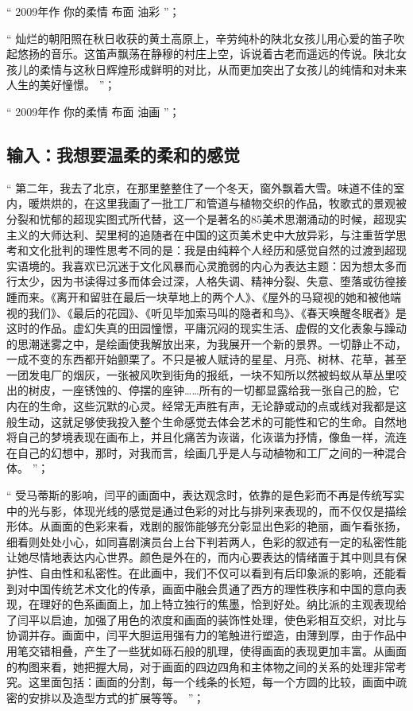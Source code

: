 \documentclass[master,oneside]{zjuthesis}
\begin{document}
“ 2009年作 你的柔情 布面 油彩 ”；

“ 灿烂的朝阳照在秋日收获的黄土高原上，辛劳纯朴的陕北女孩儿用心爱的笛子吹起悠扬的音乐。这笛声飘荡在静穆的村庄上空，诉说着古老而遥远的传说。陕北女孩儿的柔情与这秋日辉煌形成鲜明的对比，从而更加突出了女孩儿的纯情和对未来人生的美好憧憬。 ”；

“ 2009年作 你的柔情 布面 油画 ”；

\subsection{输入：我想要温柔的柔和的感觉}
“ 第二年，我去了北京，在那里整整住了一个冬天，窗外飘着大雪。味道不佳的室内，暖烘烘的，在这里我画了一批工厂和管道与植物交织的作品，牧歌式的景观被分裂和忧郁的超现实图式所代替，这一个是著名的85美术思潮涌动的时候，超现实主义的大师达利、契里柯的追随者在中国的这页美术史中大放异彩，与注重哲学思考和文化批判的理性思考不同的是：我是由纯粹个人经历和感觉自然的过渡到超现实语境的。我喜欢已沉迷于文化风暴而心灵脆弱的内心为表达主题：因为想太多而行太少，因为书读得过多而体会过深，人格失调、精神分裂、失意、堕落或彷徨接踵而来。《离开和留驻在最后一块草地上的两个人》、《屋外的马窥视的她和被他端视的我们》、《最后的花园》、《听见毕加索马叫的隐者和鸟》、《春天唤醒冬眠者》是这时的作品。虚幻失真的田园憧憬，平庸沉闷的现实生活、虚假的文化表象与躁动的思潮迷雾之中，是绘画使我解放出来，为我展开一个新的景界。一切静止不动，一成不变的东西都开始颤栗了。不只是被人赋诗的星星、月亮、树林、花草，甚至一团发电厂的烟灰，一张被风吹到街角的报纸，一块不知所以然被蚂蚁从草丛里咬出的树皮，一座锈蚀的、停摆的座钟……所有的一切都显露给我一张自己的脸，它内在的生命，这些沉默的心灵。经常无声胜有声，无论静或动的点或线对我都是这般生动，这就足够使我投入整个生命感觉去体会艺术的可能性和它的生命。自然地将自己的梦境表现在画布上，并且化痛苦为诙谐，化诙谐为抒情，像鱼一样，流连在自己的幻想中，那时，对我而言，绘画几乎是人与动植物和工厂之间的一种混合体。 ”；

“ 受马蒂斯的影响，闫平的画面中，表达观念时，依靠的是色彩而不再是传统写实中的光与影，体现光线的感觉是通过色彩的对比与排列来表现的，而不仅仅是描绘形体。从画面的色彩来看，戏剧的服饰能够充分彰显出色彩的艳丽，画乍看张扬，细看则处处小心，如同喜剧演员台上台下判若两人，色彩的叙述有一定的私密性能让她尽情地表达内心世界。颜色是外在的，而内心要表达的情绪置于其中则具有保护性、自由性和私密性。在此画中，我们不仅可以看到有后印象派的影响，还能看到对中国传统艺术文化的传承，画面中融会贯通了西方的理性秩序和中国的意向表现，在理好的色系画面上，加上特立独行的焦墨，恰到好处。纳比派的主观表现给了闫平以启迪，加强了用色的浓度和画面的装饰性处理，使色彩相互交织，对比与协调并存。画面中，闫平大胆运用强有力的笔触进行塑造，由薄到厚，由于作品中用笔交错相叠，产生了一些犹如砾石般的肌理，使得画面的表现更加丰富。从画面的构图来看，她把握大局，对于画面的四边四角和主体物之间的关系的处理非常考究。这里面包括：画面的分割，每一个线条的长短，每一个方圆的比较，画面中疏密的安排以及造型方式的扩展等等。 ”；
\end{document}
